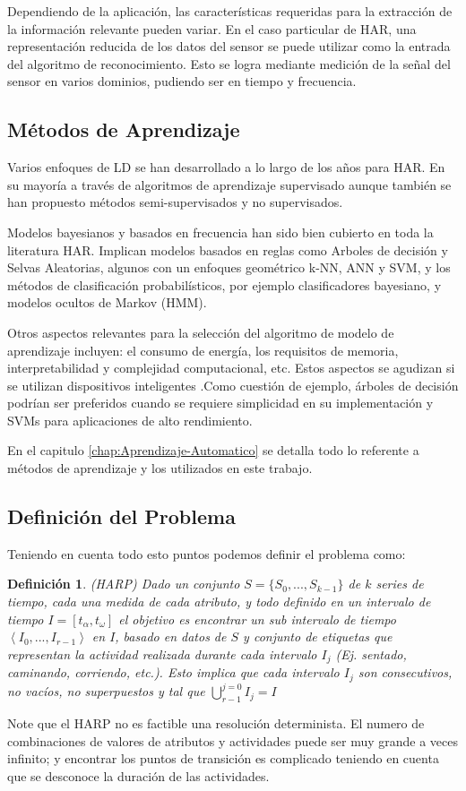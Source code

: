 Dependiendo de la aplicación, las características requeridas para
la extracción de la información relevante pueden variar. En el caso
particular de HAR, una representación reducida de los datos del sensor
se puede utilizar como la entrada del algoritmo de reconocimiento.
Esto se logra mediante medición de la señal del sensor en varios dominios,
pudiendo ser en tiempo y frecuencia.

\subsection{Métodos de Aprendizaje}

Varios enfoques de LD se han desarrollado a lo largo de los años para
HAR. En su mayoría a través de algoritmos de aprendizaje supervisado
aunque también se han propuesto métodos semi-supervisados y no supervisados.

Modelos bayesianos y basados en frecuencia han sido bien cubierto
en toda la literatura HAR. Implican modelos basados en reglas como
Arboles de decisión y Selvas Aleatorias, algunos con un enfoques geométrico
k-NN, ANN y SVM, y los métodos de clasificación probabilísticos, por
ejemplo clasificadores bayesiano, y modelos ocultos de Markov (HMM).

Otros aspectos relevantes para la selección del algoritmo de modelo
de aprendizaje incluyen: el consumo de energía, los requisitos de
memoria, interpretabilidad y complejidad computacional, etc. Estos
aspectos se agudizan si se utilizan dispositivos inteligentes .Como
cuestión de ejemplo, árboles de decisión podrían ser preferidos cuando
se requiere simplicidad en su implementación y SVMs para aplicaciones
de alto rendimiento.

En el capitulo \ref{chap:Aprendizaje-Automatico} se detalla todo
lo referente a métodos de aprendizaje y los utilizados en este trabajo.

\subsection{Definición del Problema}

Teniendo en cuenta todo esto puntos podemos definir el problema como:

\newtheorem{defi}{Definición}

\begin{defi}(HARP) Dado un conjunto $S=\{S_{0},...,S_{k-1}\}$ de
$k$ series de tiempo, cada una medida de cada atributo, y todo definido
en un intervalo de tiempo $I=\left[t_{\alpha},t_{\omega}\right]$
el objetivo es encontrar un sub intervalo de tiempo $\left\langle I_{0},...,I_{r-1}\right\rangle $
en $I$, basado en datos de $S$ y conjunto de etiquetas que representan
la actividad realizada durante cada intervalo $I_{j}$ (Ej. sentado,
caminando, corriendo, etc.). Esto implica que cada intervalo $I_{j}$
son consecutivos, no vacíos, no superpuestos y tal que ${\displaystyle \bigcup_{r-1}^{j=0}{I_{j}=I}}$
\end{defi}

Note que el HARP no es factible una resolución determinista. El numero
de combinaciones de valores de atributos y actividades puede ser muy
grande a veces infinito; y encontrar los puntos de transición es complicado
teniendo en cuenta que se desconoce la duración de las actividades.
